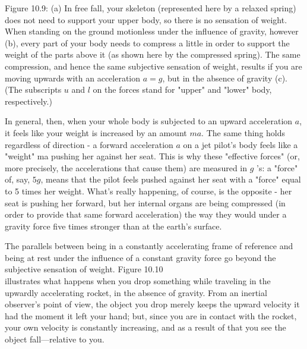 \documentclass[10pt]{article}
\begin{document}
Figure 10.9: (a) In free fall, your skeleton (represented here by a relaxed spring) does not need to support your upper body, so there is no sensation of weight. When standing on the ground motionless under the influence of gravity, however (b), every part of your body needs to compress a little in order to support the weight of the parts above it (as shown here by the compressed spring). The same compression, and hence the same subjective sensation of weight, results if you are moving upwards with an acceleration $a=g$, but in the absence of gravity (c). (The subscripts $u$ and $l$ on the forces stand for "upper" and "lower" body, respectively.)

In general, then, when your whole body is subjected to an upward acceleration $a$, it feels like your weight is increased by an amount $m a$. The same thing holds regardless of direction - a forward acceleration $a$ on a jet pilot's body feels like a "weight" ma pushing her against her seat. This is why these "effective forces" (or, more precisely, the accelerations that cause them) are measured in $g$ 's: a "force" of, say, $5 g$, means that the pilot feels pushed against her seat with a "force" equal to 5 times her weight. What's really happening, of course, is the opposite - her seat is pushing her forward, but her internal organs are being compressed (in order to provide that same forward acceleration) the way they would under a gravity force five times stronger than at the earth's surface.

The parallels between being in a constantly accelerating frame of reference and being at rest under the influence of a constant gravity force go beyond the subjective sensation of weight. Figure 10.10\\
illustrates what happens when you drop something while traveling in the upwardly accelerating rocket, in the absence of gravity. From an inertial observer's point of view, the object you drop merely keeps the upward velocity it had the moment it left your hand; but, since you are in contact with the rocket, your own velocity is constantly increasing, and as a result of that you see the object fall—relative to you.
\end{document}
